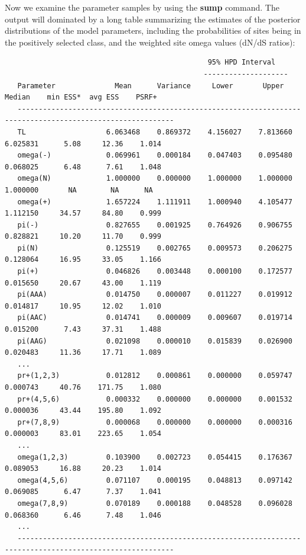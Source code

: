 \documentclass[12pt]{book}
\begin{document}
Now we examine the parameter samples by using the \textbf{sump} command. The output will dominated by a long
table summarizing the estimates of the posterior distributions of the model parameters, including the probabilities
of sites being in the positively selected class, and the weighted site omega values (dN/dS ratios):


\begin{singlespacing}
\tiny
\begin{verbatim}
                                                95% HPD Interval
                                               --------------------
   Parameter              Mean      Variance     Lower       Upper       Median    min ESS*  avg ESS    PSRF+ 
   -----------------------------------------------------------------------------------------------------------
   TL                   6.063468    0.869372    4.156027    7.813660    6.025831      5.08     12.36    1.014
   omega(-)             0.069961    0.000184    0.047403    0.095480    0.068025      6.48      7.61    1.048
   omega(N)             1.000000    0.000000    1.000000    1.000000    1.000000       NA        NA      NA   
   omega(+)             1.657224    1.111911    1.000940    4.105477    1.112150     34.57     84.80    0.999
   pi(-)                0.827655    0.001925    0.764926    0.906755    0.828821     10.20     11.70    0.999
   pi(N)                0.125519    0.002765    0.009573    0.206275    0.128064     16.95     33.05    1.166
   pi(+)                0.046826    0.003448    0.000100    0.172577    0.015650     20.67     43.00    1.119
   pi(AAA)              0.014750    0.000007    0.011227    0.019912    0.014817     10.95     12.02    1.010
   pi(AAC)              0.014741    0.000009    0.009607    0.019714    0.015200      7.43     37.31    1.488
   pi(AAG)              0.021098    0.000010    0.015839    0.026900    0.020483     11.36     17.71    1.089
   ...
   pr+(1,2,3)           0.012812    0.000861    0.000000    0.059747    0.000743     40.76    171.75    1.080
   pr+(4,5,6)           0.000332    0.000000    0.000000    0.001532    0.000036     43.44    195.80    1.092
   pr+(7,8,9)           0.000068    0.000000    0.000000    0.000316    0.000003     83.01    223.65    1.054
   ...
   omega(1,2,3)         0.103900    0.002723    0.054415    0.176367    0.089053     16.88     20.23    1.014
   omega(4,5,6)         0.071107    0.000195    0.048813    0.097142    0.069085      6.47      7.37    1.041
   omega(7,8,9)         0.070189    0.000188    0.048528    0.096028    0.068360      6.46      7.48    1.046
   ...
   -----------------------------------------------------------------------------------------------------------

\end{verbatim}
\normalsize
\end{singlespacing}
\end{document}
